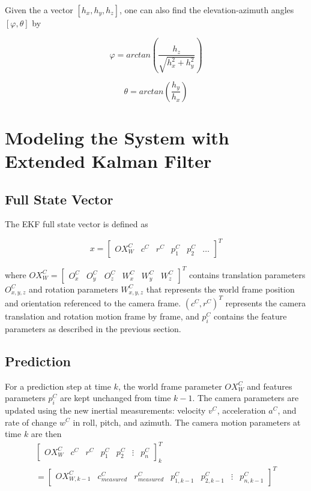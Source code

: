 \noindent Given the a vector $[h_x, h_y, h_z]$, one can also find the
elevation-azimuth angles $[\varphi, \theta]$ by

\begin{equation}
\label{eq:m_inv_varphi}
\varphi 
=arctan\left(\frac{h_{z}}{\sqrt{h_x^2+h_y^2}}\right)
\end{equation}

\begin{equation}
\label{eq:m_inv_theta}
\theta =arctan\left(\frac{h_{y}}{h_{x}}\right)
\end{equation}


\section{Modeling the System with Extended Kalman 
Filter}

\subsection{Full State Vector}

The EKF full state vector is defined as 

\begin{equation}
x=\begin{bmatrix}
OX_{W}^{C} & c^{C} & r^{C} & p_{1}^{C} & p_{2}^{C} & \ldots 
\end{bmatrix}^T
\end{equation}

\noindent where $OX_{W}^{C}= \begin{bmatrix}O_{x}^{C} & O_{y}^{C} &
  O_{z}^{C} & W_{x}^{C} & W_{y}^{C} & W_{z}^{C} \end{bmatrix}^{T}$
contains translation parameters $O_{x,y,z}^{C}$ and rotation
parameters $W_{x,y,z}^{C}$ that represents the world frame position
and orientation referenced to the camera frame.
$\left(c^{C},r^{C}\right)^{T}$ represents the camera translation and
rotation motion frame by frame, and $p_{i}^{C}$ contains the feature
parameters as described in the previous section.

\subsection{Prediction}

For a prediction step at time $k$, the world frame parameter $OX_W^C$
and features parameters $p_i^C$ are kept unchanged from time $k-1$.
The camera parameters are updated using the new inertial measurements:
velocity $v^{C}$, acceleration $a^{C}$, and rate of change $w^{C}$ in
roll, pitch, and azimuth. The camera motion parameters at time $k$ are
then
\begin{multline}
\begin{bmatrix}
OX_{W}^{C} & c^{C} & r^{C} & p_{1}^{C}& p_{2}^{C} & \vdots & p_n^C
\end{bmatrix}_{k}^T \\
=\begin{bmatrix}
OX_{W,k-1}^{C} & c_{measured}^{C} & r_{measured}^{C} & p_{1,k-1}^{C} &
p_{2,k-1}^{C} & \vdots & p_{n,k-1}^C
\end{bmatrix}^T
\end{multline}


